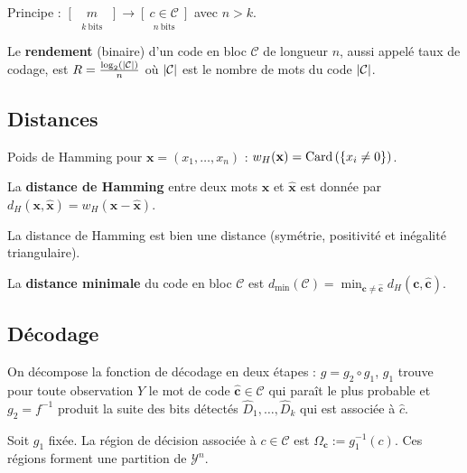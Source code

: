 	Principe : $\underset{k\ \text{bits}}{[\quad m\quad ]} \longrightarrow \underset{n\ \text{bits}}{[\ c \in \mathcal{C}\ ]}$ avec $n > k$.

	\begin{defn}
		Le \textbf{rendement} (binaire) d'un code en bloc $\mathcal{C}$ de longueur $n$, aussi appelé taux de codage, est $R = \frac{\log_2(\left\lvert\mathcal{C}\right\rvert)}{n}$ où $\left\lvert\mathcal{C}\right\rvert$ est le nombre de mots du code $\left\lvert\mathcal{C}\right\rvert$.
	\end{defn}


\subsection{Distances}

	\begin{defn}
		Poids de Hamming pour $\mathbf{x} = (x_1,\ldots,x_n)$ : $w_H(\mathbf{x}) = \operatorname{Card} \left( \left\{ x_i \neq 0 \right\} \right)$.
	\end{defn}

	\begin{defn}
		La \textbf{distance de Hamming} entre deux mots $\mathbf{x}$ et $\mathbf{\hat{x}}$ est donnée par $d_H(\mathbf{x},\mathbf{\hat{x}}) = w_H(\mathbf{x} - \mathbf{\hat{x}})$.
	\end{defn}

	\begin{pop}
		La distance de Hamming est bien une distance (symétrie, positivité et inégalité triangulaire).
	\end{pop}

	\begin{defn}
		La \textbf{distance minimale} du code en bloc $\mathcal{C}$ est
		$d_{\min}(\mathcal{C}) =
			\min_{ \mathbf{c} \neq \mathbf{\hat{c}} }
			d_H(\mathbf{c},\mathbf{\hat{c}})$.
	\end{defn}


\subsection{Décodage}

	On décompose la fonction de décodage en deux étapes : $g = g_2 \circ g_1$, $g_1$ trouve pour toute observation $Y$ le mot de code $\mathbf{\hat{c}} \in \mathcal{C}$ qui paraît le plus probable et $g_2 = f^{-1}$ produit la suite des bits détectés $\hat{D}_1,\ldots,\hat{D}_k$ qui est associée à $\hat{c}$.

	\begin{defn}
		Soit $g_1$ fixée. La région de décision associée à $c \in \mathcal{C}$ est $\Omega_{\mathbf{c}} := g_1^{-1}(c)$.
		Ces régions forment une partition de $\mathcal{Y}^n$.
	\end{defn}

